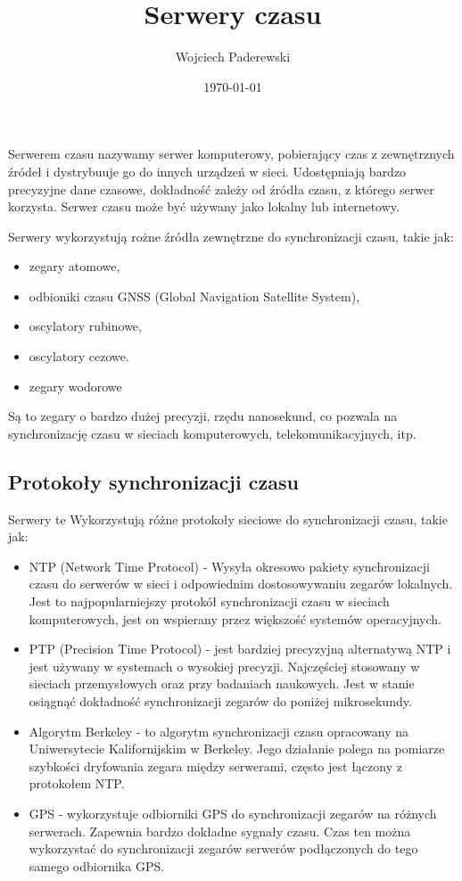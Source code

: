 \documentclass[../main.tex]{subfiles}
\author{Wojciech Paderewski}
\date{\today}
\title{Serwery czasu}
\begin{document}
Serwerem czasu nazywamy serwer komputerowy, pobierający czas z zewnętrznych źródeł i dystrybuuje go do innych urządzeń w sieci.
Udostępniają bardzo precyzyjne dane czasowe, dokładność zależy od źródła czasu, z którego serwer korzysta. Serwer czasu może być używany jako lokalny lub internetowy.

Serwery wykorzystują rożne źródła zewnętrzne do synchronizacji czasu, takie jak:
\begin{itemize}
  \item zegary atomowe,
  \item odbioniki czasu GNSS (Global Navigation Satellite System),
  \item oscylatory rubinowe,
  \item oscylatory cezowe.
  \item zegary wodorowe
\end{itemize}

Są to zegary o bardzo dużej precyzji, rzędu nanosekund, co pozwala na synchronizację czasu w sieciach komputerowych, telekomunikacyjnych, itp.

\subsection{Protokoły synchronizacji czasu}
Serwery te Wykorzystują różne protokoły sieciowe do synchronizacji czasu, takie jak:
\begin{itemize}
  \item NTP (Network Time Protocol) - 
  Wysyła okresowo pakiety synchronizacji czasu do serwerów w sieci i odpowiednim dostosowywaniu zegarów lokalnych.
  Jest to najpopularniejszy protokół synchronizacji czasu w sieciach komputerowych, jest on wspierany przez większość systemów operacyjnych.
  \item PTP (Precision Time Protocol) - 
  jest bardziej precyzyjną alternatywą NTP i jest używany w systemach o wysokiej precyzji. Najczęściej stosowany w sieciach przemysłowych oraz przy badaniach naukowych. 
  Jest w stanie osiągnąć dokładność synchronizacji zegarów do poniżej mikrosekundy.
  \item Algorytm Berkeley - to algorytm synchronizacji czasu opracowany na Uniwersytecie Kalifornijskim w Berkeley. 
  Jego działanie polega na pomiarze szybkości dryfowania zegara między serwerami, często jest łączony z protokołem NTP.
  \item GPS -  wykorzystuje odbiorniki GPS do synchronizacji zegarów na różnych serwerach.
   Zapewnia bardzo dokładne sygnały czasu. Czas ten można wykorzystać do synchronizacji
  zegarów serwerów podłączonych do tego samego odbiornika GPS. 
\end{itemize}
\end{document}

